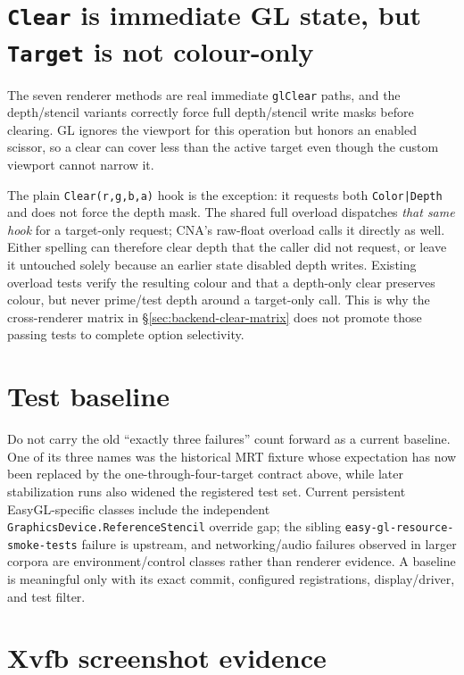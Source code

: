 \section{\texttt{Clear} is immediate GL state, but \texttt{Target} is not colour-only}

The seven renderer methods are real immediate \texttt{glClear} paths, and the depth/stencil
variants correctly force full depth/stencil write masks before clearing. GL ignores the
viewport for this operation but honors an enabled scissor, so a clear can cover less than the
active target even though the custom viewport cannot narrow it.

The plain \texttt{Clear(r,g,b,a)} hook is the exception: it requests both
\texttt{Color|Depth} and does not force the depth mask. The shared full overload dispatches
\emph{that same hook} for a target-only request; CNA's raw-float overload calls it
directly as well. Either spelling can therefore clear depth that the caller did not request,
or leave it untouched solely because an earlier state disabled depth writes. Existing overload
tests verify the resulting colour and that a depth-only clear preserves colour, but never
prime/test depth around a target-only call. This is why the cross-renderer matrix in
\S\ref{sec:backend-clear-matrix} does not promote those passing tests to complete option
selectivity.

\section{Test baseline}

Do not carry the old ``exactly three failures'' count forward as a current baseline. One of its
three names was the historical MRT fixture whose expectation has now been replaced by the
one-through-four-target contract above, while later stabilization runs also widened the registered
test set. Current persistent EasyGL-specific classes include the independent
\texttt{GraphicsDevice.ReferenceStencil} override gap; the sibling
\texttt{easy-gl-resource-smoke-tests} failure is upstream, and networking/audio failures observed
in larger corpora are environment/control classes rather than renderer evidence. A baseline is
meaningful only with its exact commit, configured registrations, display/driver, and test filter.

\section{Xvfb screenshot evidence}

